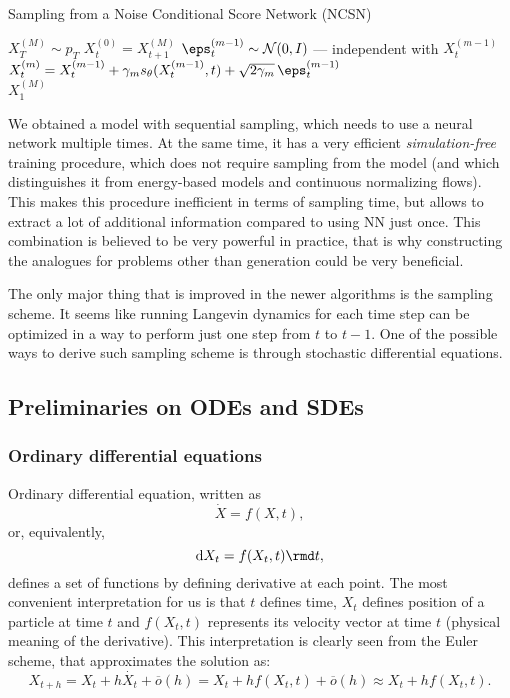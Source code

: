 \begin{algorithm}
\caption{Sampling from a Noise Conditional Score Network (NCSN)}\label{alg:sampling_ncsn}
\begin{algorithmic}

\State $X_T^{(M)} \sim p_T$
    \State $X_t^{(0)} = X_{t + 1}^{(M)}$
     
        \State $\eps_t^{(m - 1)} \sim \mathcal{N}(0, I)$ --- independent with $X_t^{(m - 1)}$
        \State $X_t^{(m)} = X_t^{(m - 1)} + \gamma_m s_\theta(X_t^{(m - 1)}, t) + \sqrt{2 \gamma_m}\, \eps_t^{(m - 1)}$ 
    \EndFor
\EndFor \\
\Return $X_1^{(M)}$
\end{algorithmic}
\end{algorithm}

We obtained a model with sequential sampling, which needs to use a neural network multiple times. At the same time, it has a very efficient \emph{simulation-free} training procedure, which does not require sampling from the model (and which distinguishes it from energy-based models and continuous normalizing flows). This makes this procedure inefficient in terms of sampling time, but allows to extract a lot of additional information compared to using NN just once. This combination is believed to be very powerful in practice, that is why constructing the analogues for problems other than generation could be very beneficial.

The only major thing that is improved in the newer algorithms is the sampling scheme. It seems like running Langevin dynamics for each time step can be optimized in a way to perform just one step from $t$ to $t - 1$. One of the possible ways to derive such sampling scheme is through stochastic differential equations.


\subsection{Preliminaries on ODEs and SDEs}

\subsubsection{Ordinary differential equations}

Ordinary differential equation, written as
\[
    \dot{X} = f(X, t),
\]
or, equivalently,
\begin{equation}
\label{eq:ode}
    \mathrm d X_t = f(X_t, t) \rmd t,
\end{equation}
defines a set of functions by defining derivative at each point. The most convenient interpretation for us is that $t$ defines time, $X_t$ defines position of a particle at time $t$ and $f(X_t, t)$ represents its velocity vector at time $t$ (physical meaning of the derivative). This interpretation is clearly seen from the Euler scheme, that approximates the solution as:
\begin{equation}\label{eq:ode_euler}
    X_{t + h} = X_t + h \dot{X_t} + \overline{o}(h) = X_t + h f(X_t, t) + \overline{o}(h) \approx X_t + h f(X_t, t).
\end{equation}


